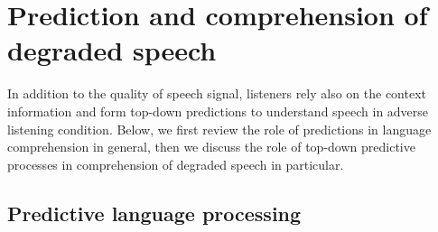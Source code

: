 \documentclass[a4paper, nobind]{templates/ociamthesis}
\begin{document}
\hypertarget{prediction-and-comprehension-of-degraded-speech}{%
\section{Prediction and comprehension of degraded speech}\label{prediction-and-comprehension-of-degraded-speech}}

In addition to the quality of speech signal, listeners rely also on the context information and form top-down predictions to understand speech in adverse listening condition.
Below, we first review the role of predictions in language comprehension in general,
then we discuss the role of top-down predictive processes in comprehension of degraded speech in particular.

\hypertarget{predictive-language-processing}{%
\subsection{Predictive language processing}\label{predictive-language-processing}}
\end{document}
